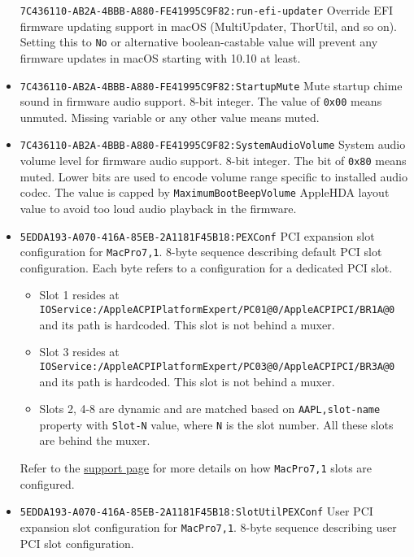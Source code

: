 \documentclass[]{article}
\providecommand{\tightlist}{%
  \setlength{\itemsep}{0pt}\setlength{\parskip}{0pt}}
\begin{document}
\begin{itemize}
  \texttt{7C436110-AB2A-4BBB-A880-FE41995C9F82:run-efi-updater}
  \break
  Override EFI firmware updating support in macOS (MultiUpdater, ThorUtil, and so on).
  Setting this to \texttt{No} or alternative boolean-castable value will prevent
  any firmware updates in macOS starting with 10.10 at least.
\item
  \texttt{7C436110-AB2A-4BBB-A880-FE41995C9F82:StartupMute}
  \break
  Mute startup chime sound in firmware audio support. 8-bit integer.
  The value of \texttt{0x00} means unmuted. Missing variable or any
  other value means muted.
\item
  \texttt{7C436110-AB2A-4BBB-A880-FE41995C9F82:SystemAudioVolume}
  \break
  System audio volume level for firmware audio support. 8-bit integer.
  The bit of \texttt{0x80} means muted. Lower bits are used to encode
  volume range specific to installed audio codec. The value is capped
  by \texttt{MaximumBootBeepVolume} AppleHDA layout value to avoid
  too loud audio playback in the firmware.
\item
  \texttt{5EDDA193-A070-416A-85EB-2A1181F45B18:PEXConf}
  \break
  PCI expansion slot configuration for \texttt{MacPro7,1}.
  8-byte sequence describing default PCI slot configuration.
  Each byte refers to a configuration for a dedicated PCI slot.

  \begin{itemize}
    \tightlist
    \item Slot 1 resides at \texttt{IOService:/AppleACPIPlatformExpert/PC01@0/AppleACPIPCI/BR1A@0}
      and its path is hardcoded. This slot is not behind a muxer.
    \item Slot 3 resides at \texttt{IOService:/AppleACPIPlatformExpert/PC03@0/AppleACPIPCI/BR3A@0}
      and its path is hardcoded. This slot is not behind a muxer.
    \item Slots 2, 4-8 are dynamic and are matched based on \texttt{AAPL,slot-name} property
      with \texttt{Slot-N} value, where \texttt{N} is the slot number. All these slots are
      behind the muxer.
  \end{itemize}

  Refer to the \href{https://support.apple.com/HT210104}{support page}
  for more details on how \texttt{MacPro7,1} slots are configured.

\item
  \texttt{5EDDA193-A070-416A-85EB-2A1181F45B18:SlotUtilPEXConf}
  \break
  User PCI expansion slot configuration for \texttt{MacPro7,1}.
  8-byte sequence describing user PCI slot configuration.

\end{itemize}
\end{document}
